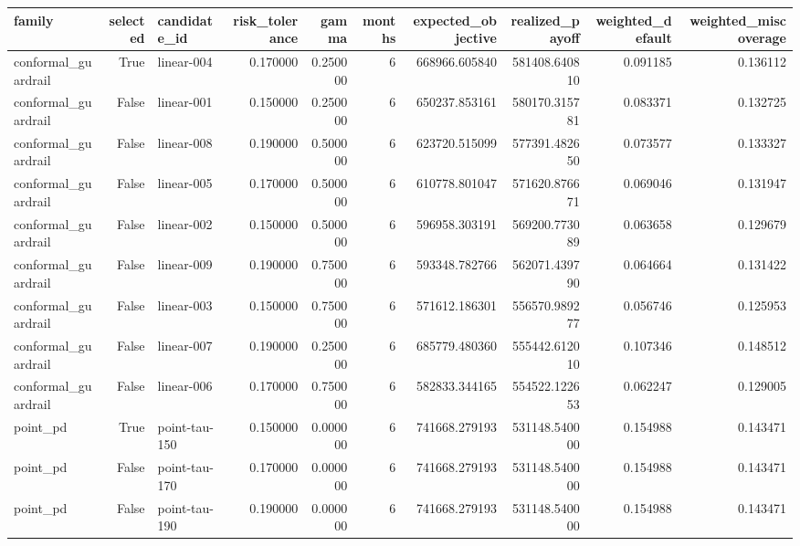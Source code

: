 \begin{tabular}{lrlrrrrrrr}
\toprule
family & selected & candidate\_id & risk\_tolerance & gamma & months & expected\_objective & realized\_payoff & weighted\_default & weighted\_miscoverage \\
\midrule
conformal\_guardrail & True & linear-004 & 0.170000 & 0.250000 & 6 & 668966.605840 & 581408.640810 & 0.091185 & 0.136112 \\
conformal\_guardrail & False & linear-001 & 0.150000 & 0.250000 & 6 & 650237.853161 & 580170.315781 & 0.083371 & 0.132725 \\
conformal\_guardrail & False & linear-008 & 0.190000 & 0.500000 & 6 & 623720.515099 & 577391.482650 & 0.073577 & 0.133327 \\
conformal\_guardrail & False & linear-005 & 0.170000 & 0.500000 & 6 & 610778.801047 & 571620.876671 & 0.069046 & 0.131947 \\
conformal\_guardrail & False & linear-002 & 0.150000 & 0.500000 & 6 & 596958.303191 & 569200.773089 & 0.063658 & 0.129679 \\
conformal\_guardrail & False & linear-009 & 0.190000 & 0.750000 & 6 & 593348.782766 & 562071.439790 & 0.064664 & 0.131422 \\
conformal\_guardrail & False & linear-003 & 0.150000 & 0.750000 & 6 & 571612.186301 & 556570.989277 & 0.056746 & 0.125953 \\
conformal\_guardrail & False & linear-007 & 0.190000 & 0.250000 & 6 & 685779.480360 & 555442.612010 & 0.107346 & 0.148512 \\
conformal\_guardrail & False & linear-006 & 0.170000 & 0.750000 & 6 & 582833.344165 & 554522.122653 & 0.062247 & 0.129005 \\
point\_pd & True & point-tau-150 & 0.150000 & 0.000000 & 6 & 741668.279193 & 531148.540000 & 0.154988 & 0.143471 \\
point\_pd & False & point-tau-170 & 0.170000 & 0.000000 & 6 & 741668.279193 & 531148.540000 & 0.154988 & 0.143471 \\
point\_pd & False & point-tau-190 & 0.190000 & 0.000000 & 6 & 741668.279193 & 531148.540000 & 0.154988 & 0.143471 \\
\bottomrule
\end{tabular}
